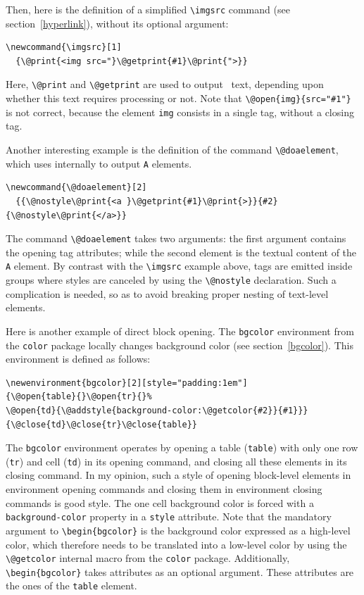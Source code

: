 Then, here is the definition of a simplified \verb+\imgsrc+
command (see section~\ref{hyperlink}), without its optional argument:
\begin{verbatim}
\newcommand{\imgsrc}[1]
  {\@print{<img src="}\@getprint{#1}\@print{">}}
\end{verbatim}
Here, \verb+\@print+ and \verb+\@getprint+ are used to output
\html~text, depending upon whether this text requires processing or not.
Note that \verb+\@open{img}{src="#1"}+ is not correct,
because the element \verb+img+ consists in a single tag, without a
closing tag.

Another interesting example is the definition of the command
\verb+\@doaelement+,
which \hevea{} uses internally to output \texttt{A} elements.
\begin{verbatim}
\newcommand{\@doaelement}[2]
  {{\@nostyle\@print{<a }\@getprint{#1}\@print{>}}{#2}{\@nostyle\@print{</a>}}
\end{verbatim}
The command \verb+\@doaelement+ takes two arguments: the first
argument contains the opening tag attributes; while the second element is
the textual content of the \verb+A+ element.
By contrast with the \verb+\imgsrc+ example above,
tags are emitted inside groups where styles are canceled by using the
\verb+\@nostyle+ declaration.
Such a complication is needed, so as to avoid breaking proper nesting
of text-level elements.

\label{getcolor:usage}
Here is another example of direct block opening.
The \texttt{bgcolor} environment from the \texttt{color} package
locally changes background color (see section~\ref{bgcolor}).
This environment is defined as follows:
\begin{verbatim}
\newenvironment{bgcolor}[2][style="padding:1em"]
{\@open{table}{}\@open{tr}{}%
\@open{td}{\@addstyle{background-color:\@getcolor{#2}}{#1}}}
{\@close{td}\@close{tr}\@close{table}}
\end{verbatim}
The \texttt{bgcolor} environment operates by opening a \html{} table
(\verb+table+) with only one row (\verb+tr+) and cell (\verb+td+) in
its opening command, and closing all these elements in its closing
command. In my opinion, such a style of opening block-level elements
in environment opening commands and closing them in environment
closing commands is good style.
%
The one cell background color is forced with a \verb+background-color+
property in a \verb+style+ attribute.
Note that the mandatory argument to \verb+\begin{bgcolor}+ is the
background color expressed as a high-level color, which therefore
needs to be translated into a low-level color by using the
\verb+\@getcolor+ internal macro from the \texttt{color} package.
Additionally,  \verb+\begin{bgcolor}+ takes \html{} attributes
as an optional argument. These attributes are the ones of the
\verb+table+ element.

